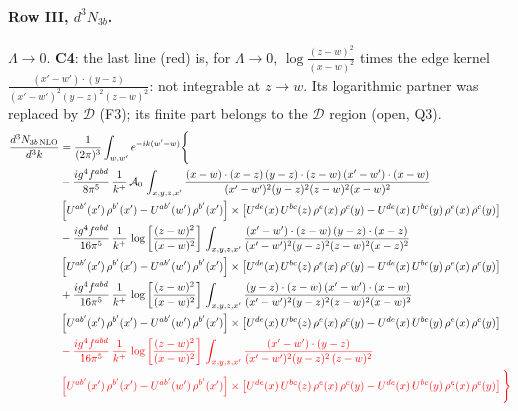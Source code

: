 \documentclass[10pt]{article}
\numberwithin{equation}{section}
\newcommand{\old}[1]{{\color{red}#1}}
\newcommand{\rc}{\color{red}}
\begin{document}
\paragraph{Row III, $d^3N_{3b}$.}
$\Lambda\to0$. \textbf{C4}: the last line (\old{red}) is, for $\Lambda\to0$, $\log\frac{(z-w)^2}{(x-w)^2}$ times the edge kernel $\frac{(x'-w')\cdot(y-z)}{(x'-w')^2(y-z)^2(z-w)^2}$: not integrable at $z\to w$. Its logarithmic partner was replaced by $\mathcal D$ (F3); its finite part belongs to the $\mathcal D$ region (open, Q3).
\begin{align}
\frac{d^{3}N_{3b\,\rm NLO}}{d^{3}k} & = \frac{1}{(2\pi)^{3}}\int_{w,w'}e^{-ik(w'-w)}\Bigg\{\notag \\
&-\frac{ig^{4}f^{abd}}{8\pi^{5}}\,\frac{1}{k^{+}}\,\mathcal{A}_{0}\,\int_{x,y,z,x'}
\frac{(x-w)\cdot(x-z)\,(y-z)\cdot(z-w)\,(x'-w')\cdot(x-w)}{(x'-w')^{2}(y-z)^{2}(z-w)^{2}(x-w)^{2}}\notag \\ & \left[U^{ab'}(x')\,\rho^{b'}(x')-U^{ab'}(w')\, \rho^{b'}(x')\right]\times \left[U^{de}(x)\,U^{bc}(z)\, \rho^{e}(x)\,\rho^{c}(y)-U^{de}(x)\,U^{bc}(y)\,\rho^{e}(x)\,\rho^{c}(y)\right] \notag \\
& -\frac{ig^{4}f^{abd}}{16\pi^{5}}\,\frac{1}{k^{+}}\,\log{\left[\frac{(z-w)^{2}}{(x-w)^{2}}\right]}\,\int_{x,y,z,x'}
\frac{(x'-w')\cdot(z-w)\,(y-z)\cdot(x-z)}{(x'-w')^{2}(y-z)^{2}(z-w)^{2}(x-z)^{2}}\notag \\
&\left[U^{ab'}(x')\,\rho^{b'}(x')-U^{ab'}(w')\, \rho^{b'}(x')\right]\times \left[U^{de}(x)\,U^{bc}(z)\, \rho^{e}(x)\,\rho^{c}(y)-U^{de}(x)\,U^{bc}(y)\,\rho^{e}(x)\,\rho^{c}(y)\right] \notag \\
&+ \frac{ig^{4}f^{abd}}{16\pi^{5}}\,\frac{1}{k^{+}}\,\log{\left[\frac{(z-w)^{2}}{(x-w)^{2}}\right]}\,\int_{x,y,z,x'}
\frac{(y-z)\cdot(z-w)\,(x'-w')\cdot(x-w)}{(x'-w')^{2}(y-z)^{2}(z-w)^{2}(x-w)^{2}}\notag \\ 
& \left[U^{ab'}(x')\,\rho^{b'}(x')-U^{ab'}(w')\, \rho^{b'}(x')\right]\times \left[U^{de}(x)\,U^{bc}(z)\, \rho^{e}(x)\,\rho^{c}(y)-U^{de}(x)\,U^{bc}(y)\,\rho^{e}(x)\,\rho^{c}(y)\right] \notag \\
& \rc  -\frac{ig^{4}f^{abd}}{16\pi^{5}}\,\frac{1}{k^{+}}\,\log{\left[\frac{(z-w)^{2}}{(x-w)^{2}}\right]}\,\int_{x,y,z,x'}
\frac{(x'-w')\cdot(y-z)}{(x'-w')^{2}(y-z)^{2}\,(z-w)^{2}}\notag \\ & \rc  \left[U^{ab'}(x')\,\rho^{b'}(x')-U^{ab'}(w')\, \rho^{b'}(x')\right]\times \left[U^{de}(x)\,U^{bc}(z)\, \rho^{e}(x)\,\rho^{c}(y)-U^{de}(x)\,U^{bc}(y)\,\rho^{e}(x)\,\rho^{c}(y)\right]\Bigg\} \label{eq:F:G1IIIN3b}
\end{align}
\end{document}
